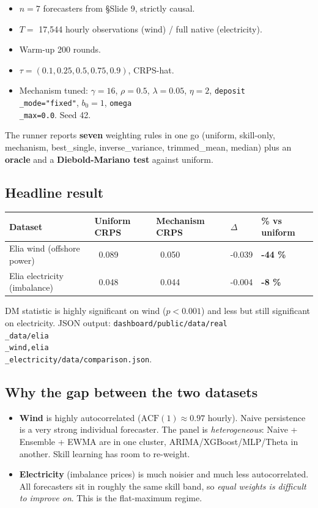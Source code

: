 \documentclass[11pt]{article}
\begin{document}
\begin{itemize}
\item $n = 7$ forecasters from \S Slide 9, strictly causal.
\item $T = $ 17{,}544 hourly observations (wind) / full native (electricity).
\item Warm-up 200 rounds.
\item $\tau = (0.1, 0.25, 0.5, 0.75, 0.9)$, CRPS-hat.
\item Mechanism tuned: $\gamma = 16$, $\rho = 0.5$, $\lambda = 0.05$, $\eta = 2$, \texttt{deposit\\_mode="fixed"}, $b_0 = 1$, \texttt{omega\\_max=0.0}. Seed 42.
\end{itemize}

The runner reports \textbf{seven} weighting rules in one go (uniform, skill-only, mechanism, best\_single, inverse\_variance, trimmed\_mean, median) plus an \textbf{oracle} and a \textbf{Diebold-Mariano test} against uniform.

\subsection{Headline result}


\begin{center}
\begin{tabular}{lllll}
\toprule
Dataset & Uniform CRPS & Mechanism CRPS & $\Delta$ & \% vs uniform \\
\midrule
Elia wind (offshore power) & ~0.089 & ~0.050 & -0.039 & \textbf{-44 \%} \\
Elia electricity (imbalance) & ~0.048 & ~0.044 & -0.004 & \textbf{-8 \%} \\
\bottomrule
\end{tabular}
\end{center}

DM statistic is highly significant on wind ($p < 0.001$) and less but still significant on electricity. JSON output: \texttt{dashboard/public/data/real\\_data/{elia\\_wind,elia\\_electricity}/data/comparison.json}.

\subsection{Why the gap between the two datasets}


\begin{itemize}
\item \textbf{Wind} is highly autocorrelated ($\text{ACF}(1) \approx 0.97$ hourly). Naive persistence is a very strong individual forecaster. The panel is \emph{heterogeneous}: Naive + Ensemble + EWMA are in one cluster, ARIMA/XGBoost/MLP/Theta in another. Skill learning has room to re-weight.
\item \textbf{Electricity} (imbalance prices) is much noisier and much less autocorrelated. All forecasters sit in roughly the same skill band, so \emph{equal weights is difficult to improve on}. This is the flat-maximum regime.
\end{itemize}
\end{document}
